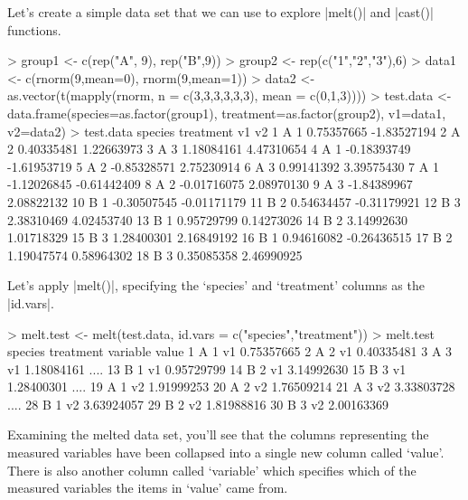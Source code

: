 Let's create a simple data set that we can use to explore |melt()| and |cast()| functions.
%
\begin{R}
> group1 <- c(rep("A", 9), rep("B",9))
> group2 <- rep(c("1","2","3"),6)
> data1 <- c(rnorm(9,mean=0), rnorm(9,mean=1))
> data2 <- as.vector(t(mapply(rnorm, n = c(3,3,3,3,3,3), mean = c(0,1,3))))
> test.data <- data.frame(species=as.factor(group1), 
                          treatment=as.factor(group2), 
                          v1=data1, v2=data2)
> test.data
   species treatment          v1          v2
1        A         1  0.75357665 -1.83527194
2        A         2  0.40335481  1.22663973
3        A         3  1.18084161  4.47310654
4        A         1 -0.18393749 -1.61953719
5        A         2 -0.85328571  2.75230914
6        A         3  0.99141392  3.39575430
7        A         1 -1.12026845 -0.61442409
8        A         2 -0.01716075  2.08970130
9        A         3 -1.84389967  2.08822132
10       B         1 -0.30507545 -0.01171179
11       B         2  0.54634457 -0.31179921
12       B         3  2.38310469  4.02453740
13       B         1  0.95729799  0.14273026
14       B         2  3.14992630  1.01718329
15       B         3  1.28400301  2.16849192
16       B         1  0.94616082 -0.26436515
17       B         2  1.19047574  0.58964302
18       B         3  0.35085358  2.46990925
\end{R}
%

Let's apply |melt()|, specifying the `species' and `treatment' columns as the |id.vars|.
%
\begin{R}
> melt.test <- melt(test.data, id.vars = c("species","treatment"))
> melt.test
   species treatment variable       value
1        A         1       v1  0.75357665
2        A         2       v1  0.40335481
3        A         3       v1  1.18084161
....
13       B         1       v1  0.95729799
14       B         2       v1  3.14992630
15       B         3       v1  1.28400301
....
19       A         1       v2  1.91999253
20       A         2       v2  1.76509214
21       A         3       v2  3.33803728
....
28       B         1       v2  3.63924057
29       B         2       v2  1.81988816
30       B         3       v2  2.00163369
\end{R}
%
Examining the melted data set, you'll see that the columns representing the measured variables have been collapsed into a single new column called `value'.  There is also another column called `variable' which specifies which of the measured variables the items in `value' came from.

